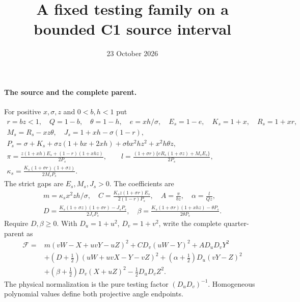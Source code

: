 \documentclass[11pt]{article}
\begin{document}
\title{A fixed testing family on a bounded C1 source interval}
\author{}\date{23 October 2026}\maketitle

\paragraph{The source and the complete parent.}
For positive $x,\sigma,z$ and $0<b,h<1$ put
\begin{gather*}
 r=bz<1,\quad Q=1-b,\quad\theta=1-h,\quad
 e=xh/\sigma,\quad E_s=1-e,\quad K_s=1+x,\quad R_s=1+xr,\\
 M_s=R_s-xz\theta,\quad J_s=1+xh-\sigma(1-r),\\
 P_s=\sigma+K_s+\sigma z(1+bx+2xh)
                          +\sigma bx^2hz^2+x^2h\theta z,\\
 \pi=\frac{z(1+xh)E_s+(1-r)(1+xhz)}{2P_s},\qquad
 l=\frac{(1+\sigma r)\{eR_s(1+\sigma z)+M_sE_s\}}{2P_s},\\
 \kappa_s=\frac{K_s(1+\sigma r)(1+\sigma z)}{2M_sP_s}.
\end{gather*}
The strict gaps are $E_s,M_s,J_s>0$. The coefficients are
\begin{gather*}
 m=\kappa_s x^2z h/\sigma,\quad
 C=\frac{K_sz(1+\sigma r)E_s}{2(1-r)P_s},\quad
 A=\frac\pi{bz},\quad \alpha=\frac l{Qz},\\
 D=\frac{K_s(1+\sigma z)(1+\sigma r)-J_sP_s}{2J_sP_s},\quad
 \beta=\frac{K_s(1+\sigma r)(1+xhz)-\theta P_s}{2\theta P_s}.
\end{gather*}
Require $D,\beta\ge0$. With $D_u=1+u^2$, $D_v=1+v^2$, write the
complete quarter-parent as
\begin{align*}
 \mathcal F={}&m(vW-X+uvY-uZ)^2+CD_v(uW-Y)^2+AD_uD_vY^2\\
 &+(D+\tfrac12)(uW+uvX-Y-vZ)^2
 +(\alpha+\tfrac12)D_u(vY-Z)^2\\
 &+(\beta+\tfrac12)D_v(X+uZ)^2-\tfrac12D_uD_vZ^2.
\end{align*}
The physical normalization is the pure testing factor $(D_uD_v)^{-1}$.
Homogeneous polynomial values define both projective angle endpoints.
\end{document}
